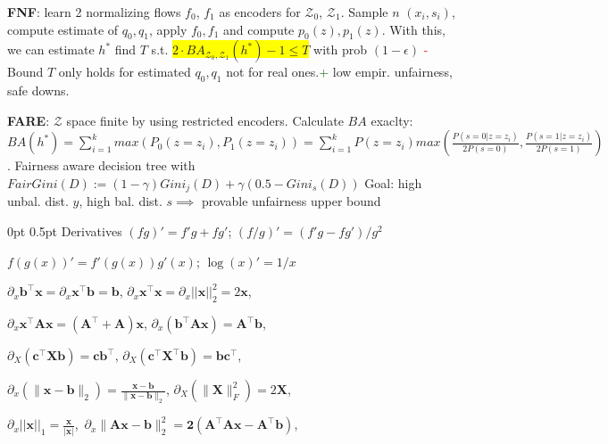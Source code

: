 \documentclass[11pt,landscape,a4paper,fleqn]{article}
\makeatletter
\renewcommand{\section}{\@startsection{section}{1}{0mm}%
                                {0pt}%
                                {0.5pt}%
                                {\color{myorange}\sffamily\small\bfseries}}
\newcommand{\mhl}[1]{\setlength{\fboxsep}{0pt}\colorbox{yellow}{#1}}
\makeatother
\begin{document}
\begin{multicols*}{4}
\textbf{FNF}: learn 2 normalizing flows $f_0$, $f_1$ as encoders for $\mathcal{Z}_0$, $\mathcal{Z}_1$. Sample $n$ $(x_i, s_i)$, compute estimate of $q_0, q_1$, apply $f_0, f_1$ and compute $p_0(z), p_1(z)$. With this, we can estimate $h^*$ find $T$ s.t. \mhl{$2 \cdot BA_{\mathcal{Z}_0, \mathcal{Z}_1}(h^*) - 1 \leq T$} with prob $(1-\epsilon)$
\textcolor{red}{-}Bound $T$ only holds for estimated $q_0, q_1$ not for real ones.\textcolor{darkgreen}{+} low empir. unfairness, safe downs.


\textbf{FARE}: $\mathcal{Z}$ space finite by using restricted encoders. Calculate $BA$ exaclty: $BA(h^*) = \sum_{i=1}^{k}max(P_0(z=z_i), P_1(z=z_i)) = \sum_{i=1}^{k}P(z=z_i)max(\frac{P(s=0|z=z_i)}{2P(s=0)},\frac{P(s=1|z=z_i)}{2P(s=1)})$. Fairness aware decision tree with $FairGini(D):= (1-\gamma) Gini_j(D) + \gamma (0.5 - Gini_s(D))$ Goal: high unbal. dist. $y$, high bal. dist. $s \implies$ provable unfairness upper bound


\section{Derivatives}
$(fg)' = f'g + fg'$; $(f/g)' = (f'g - fg')/g^2$

$f(g(x))' = f'(g(x))g'(x)$; $\log(x)' = 1/x$

$\partial_x \mathbf{b}^\top \mathbf{x} = \partial_x \mathbf{x}^\top \mathbf{b} = \mathbf{b}$,
$\partial_x \mathbf{x}^\top \mathbf{x} = \partial_x  ||\mathbf{x}||_2^2 = 2\mathbf{x}$,

$\partial_x \mathbf{x}^\top \mathbf{A}\mathbf{x} = (\mathbf{A}^\top + \mathbf{A})\mathbf{x}$, $\partial_x(\mathbf{b}^\top \mathbf{A}\mathbf{x}) = \mathbf{A}^\top \mathbf{b}$,

$\partial_X (\mathbf{c}^\top \mathbf{X} \mathbf{b}) = \mathbf{c}\mathbf{b}^\top$,
$\partial_X (\mathbf{c}^\top \mathbf{X}^\top \mathbf{b}) = \mathbf{b}\mathbf{c}^\top$,

$\partial_x (\| \mathbf{x}-\mathbf{b} \|_2) = \frac{\mathbf{x}-\mathbf{b}}{\|\mathbf{x}-\mathbf{b}\|_2}$,
$\partial_X (\|\mathbf{X}\|_F^2) = 2\mathbf{X}$,

\mbox{\fontsize{9.5}{6}\selectfont $\partial_x ||\mathbf{x}||_1 = \frac{\mathbf{x}}{|\mathbf{x}|}$,
$\partial_x \|\mathbf{Ax - b}\|_2^2 = \mathbf{2(A^\top Ax-A^\top b)}$},



\end{multicols*}
\end{document}
